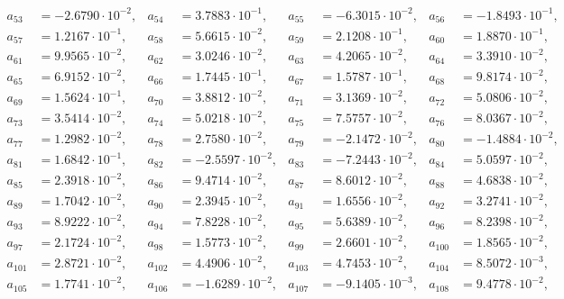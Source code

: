 \begin{align*}
a_{ 53 } &= -2.6790 \cdot 10^{ -2 }, & a_{ 54 } &= 3.7883 \cdot 10^{ -1 }, & a_{ 55 } &= -6.3015 \cdot 10^{ -2 }, & a_{ 56 } &= -1.8493 \cdot 10^{ -1 },\\ 
a_{ 57 } &= 1.2167 \cdot 10^{ -1 }, & a_{ 58 } &= 5.6615 \cdot 10^{ -2 }, & a_{ 59 } &= 2.1208 \cdot 10^{ -1 }, & a_{ 60 } &= 1.8870 \cdot 10^{ -1 },\\ 
a_{ 61 } &= 9.9565 \cdot 10^{ -2 }, & a_{ 62 } &= 3.0246 \cdot 10^{ -2 }, & a_{ 63 } &= 4.2065 \cdot 10^{ -2 }, & a_{ 64 } &= 3.3910 \cdot 10^{ -2 },\\ 
a_{ 65 } &= 6.9152 \cdot 10^{ -2 }, & a_{ 66 } &= 1.7445 \cdot 10^{ -1 }, & a_{ 67 } &= 1.5787 \cdot 10^{ -1 }, & a_{ 68 } &= 9.8174 \cdot 10^{ -2 },\\ 
a_{ 69 } &= 1.5624 \cdot 10^{ -1 }, & a_{ 70 } &= 3.8812 \cdot 10^{ -2 }, & a_{ 71 } &= 3.1369 \cdot 10^{ -2 }, & a_{ 72 } &= 5.0806 \cdot 10^{ -2 },\\ 
a_{ 73 } &= 3.5414 \cdot 10^{ -2 }, & a_{ 74 } &= 5.0218 \cdot 10^{ -2 }, & a_{ 75 } &= 7.5757 \cdot 10^{ -2 }, & a_{ 76 } &= 8.0367 \cdot 10^{ -2 },\\ 
a_{ 77 } &= 1.2982 \cdot 10^{ -2 }, & a_{ 78 } &= 2.7580 \cdot 10^{ -2 }, & a_{ 79 } &= -2.1472 \cdot 10^{ -2 }, & a_{ 80 } &= -1.4884 \cdot 10^{ -2 },\\ 
a_{ 81 } &= 1.6842 \cdot 10^{ -1 }, & a_{ 82 } &= -2.5597 \cdot 10^{ -2 }, & a_{ 83 } &= -7.2443 \cdot 10^{ -2 }, & a_{ 84 } &= 5.0597 \cdot 10^{ -2 },\\ 
a_{ 85 } &= 2.3918 \cdot 10^{ -2 }, & a_{ 86 } &= 9.4714 \cdot 10^{ -2 }, & a_{ 87 } &= 8.6012 \cdot 10^{ -2 }, & a_{ 88 } &= 4.6838 \cdot 10^{ -2 },\\ 
a_{ 89 } &= 1.7042 \cdot 10^{ -2 }, & a_{ 90 } &= 2.3945 \cdot 10^{ -2 }, & a_{ 91 } &= 1.6556 \cdot 10^{ -2 }, & a_{ 92 } &= 3.2741 \cdot 10^{ -2 },\\ 
a_{ 93 } &= 8.9222 \cdot 10^{ -2 }, & a_{ 94 } &= 7.8228 \cdot 10^{ -2 }, & a_{ 95 } &= 5.6389 \cdot 10^{ -2 }, & a_{ 96 } &= 8.2398 \cdot 10^{ -2 },\\ 
a_{ 97 } &= 2.1724 \cdot 10^{ -2 }, & a_{ 98 } &= 1.5773 \cdot 10^{ -2 }, & a_{ 99 } &= 2.6601 \cdot 10^{ -2 }, & a_{ 100 } &= 1.8565 \cdot 10^{ -2 },\\ 
a_{ 101 } &= 2.8721 \cdot 10^{ -2 }, & a_{ 102 } &= 4.4906 \cdot 10^{ -2 }, & a_{ 103 } &= 4.7453 \cdot 10^{ -2 }, & a_{ 104 } &= 8.5072 \cdot 10^{ -3 },\\ 
a_{ 105 } &= 1.7741 \cdot 10^{ -2 }, & a_{ 106 } &= -1.6289 \cdot 10^{ -2 }, & a_{ 107 } &= -9.1405 \cdot 10^{ -3 }, & a_{ 108 } &= 9.4778 \cdot 10^{ -2 },\\ 

\end{align*}
